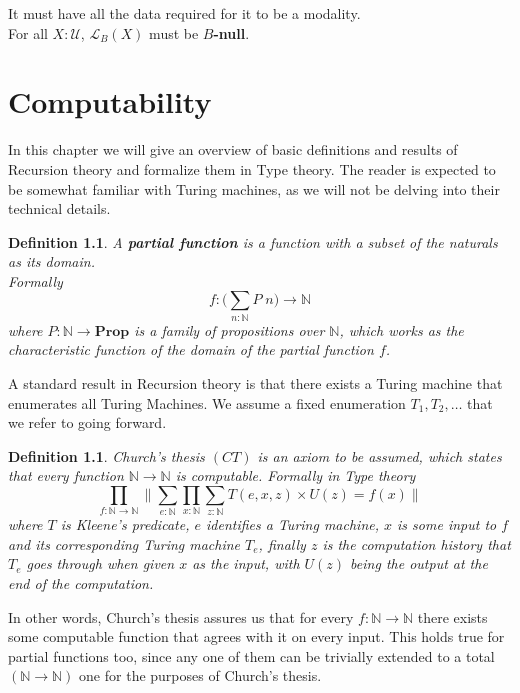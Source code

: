 \documentclass[12pt]{report}
\newtheorem{defn}[thm]{Definition}
\begin{document}
It must have all the data required for it to be a modality.\\
For all $X : \mathcal{U}$, $\mathcal{L}_B(X)$ must be $B$\textbf{-null}.

\chapter{Computability}
In this chapter we will give an overview of basic definitions and results of Recursion theory and formalize them in Type theory. 
The reader is expected to be somewhat familiar with Turing machines, as we will not be delving into their technical details. 

\begin{defn}
A \textbf{partial function} is a function with a subset of the naturals as its domain.\\
Formally 
$$f : \Big(\sum_{n : \mathbb{N}} P\; n \Big) \rightarrow \mathbb{N}$$
where $P : \mathbb{N} \rightarrow \mathbf{Prop}$ is a family of propositions over $\mathbb{N}$, which works as the characteristic function of the domain of the partial function $f$.
\end{defn}

A standard result in Recursion theory is that there exists a Turing machine that enumerates all Turing Machines. 
We assume a fixed enumeration $T_1, T_2,\ldots $ that we refer to going forward. 

\begin{defn}\label{CT}
Church's thesis $(CT)$ is an axiom to be assumed, which states that every function $\mathbb{N}\rightarrow \mathbb{N}$ is computable. 
Formally in Type theory
$$\prod_{f : \mathbb{N}\rightarrow \mathbb{N}} \Big\lVert \sum_{e : \mathbb{N}} \prod_{x : \mathbb{N}} \sum_{z : \mathbb{N}} T(e,x,z) \times U(z) = f(x) \Big\rVert$$
where $T$ is Kleene's predicate, $e$ identifies a Turing machine, $x$ is some input to $f$ and its corresponding Turing machine $T_e$, finally $z$ is the computation history that $T_e$ goes through when given $x$ as the input, with $U(z)$ being the output at the end of the computation.
\end{defn}

In other words, Church's thesis assures us that for every $f : \mathbb{N} \rightarrow \mathbb{N}$ there exists some computable function that agrees with it on every input.
This holds true for partial functions too, since any one of them can be trivially extended to a total $(\mathbb{N} \rightarrow \mathbb{N})$ one for the purposes of Church's thesis.
\end{document}
